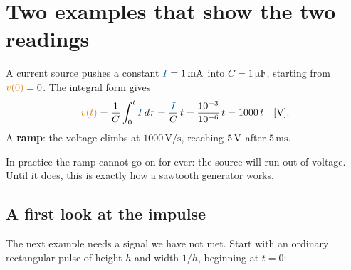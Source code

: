 \documentclass[11pt,a4paper]{article}
\newcommand{\Icol}[1]{\textcolor{ccur}{#1}}
\newcommand{\Vcol}[1]{\textcolor{cvolt}{#1}}
\newcommand{\uni}[1]{\,\mathrm{#1}}
\newcommand{\taxes}[4]{%
  \draw[vax] (-0.15,0) -- (#1,0) node[right=1pt, font=\scriptsize] {$t$};
  \draw[vax] (0,-#2) -- (0,#3) node[above=1pt, font=\scriptsize] {#4};}
\begin{document}
\section{Two examples that show the two readings}

\begin{examplebox}
A current source pushes a constant $\Icol{I} = 1\uni{mA}$ into $C = 1\uni{\mu F}$, starting
from $\Vcol{v(0)} = 0$. The integral form gives
\[
  \Vcol{v(t)} = \frac{1}{C}\int_0^t \Icol{I}\,d\tau = \frac{\Icol{I}}{C}\,t
  = \frac{10^{-3}}{10^{-6}}\,t = 1000\,t \quad [\mathrm{V}] .
\]
A \textbf{ramp}: the voltage climbs at $1000\uni{V/s}$, reaching $5\V$ after $5\uni{ms}$.

\begin{center}
\end{center}
\vspace{-2pt}
In practice the ramp cannot go on for ever: the source will run out of voltage. Until it
does, this is exactly how a sawtooth generator works.
\end{examplebox}

\subsection{A first look at the impulse}
\label{sec:impulse}

The next example needs a signal we have not met. Start with an ordinary rectangular pulse
of height $h$ and width $1/h$, beginning at $t = 0$:
\end{document}
